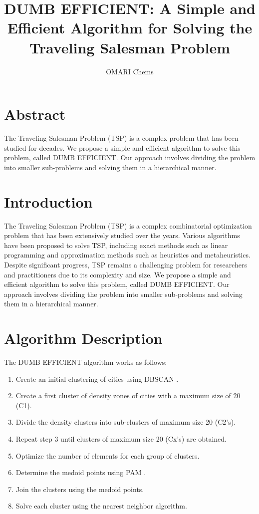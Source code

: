 \documentclass{article}
\title{DUMB EFFICIENT: A Simple and Efficient Algorithm for Solving the Traveling Salesman Problem}
\author{OMARI Chems}
\begin{document}
\maketitle

\section*{Abstract}
The Traveling Salesman Problem (TSP) is a complex problem that has been studied for decades. We propose a simple and efficient algorithm to solve this problem, called DUMB EFFICIENT. Our approach involves dividing the problem into smaller sub-problems and solving them in a hierarchical manner.

\section{Introduction}
The Traveling Salesman Problem (TSP) is a complex combinatorial optimization problem that has been extensively studied over the years. Various algorithms have been proposed to solve TSP, including exact methods such as linear programming and approximation methods such as heuristics and metaheuristics. Despite significant progress, TSP remains a challenging problem for researchers and practitioners due to its complexity and size. We propose a simple and efficient algorithm to solve this problem, called DUMB EFFICIENT. Our approach involves dividing the problem into smaller sub-problems and solving them in a hierarchical manner.

\section{Algorithm Description}
The DUMB EFFICIENT algorithm works as follows:
\begin{enumerate}
\item Create an initial clustering of cities using DBSCAN \cite{Ester1996}.
\item Create a first cluster of density zones of cities with a maximum size of 20 (C1).
\item Divide the density clusters into sub-clusters of maximum size 20 (C2's).
\item Repeat step 3 until clusters of maximum size 20 (Cx's) are obtained.
\item Optimize the number of elements for each group of clusters.
\item Determine the medoid points using PAM \cite{Kaufman1990}.
\item Join the clusters using the medoid points.
\item Solve each cluster using the nearest neighbor algorithm.
\end{enumerate}
\end{document}
